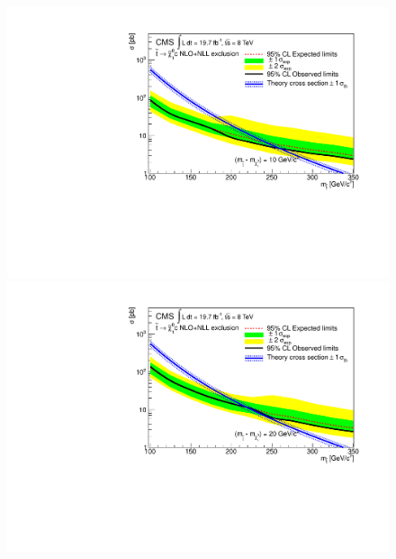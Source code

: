 \begin{figure}[!Hhtb]
  \begin{center}
  \includegraphics[scale=0.39]{Figures/sus13009/limits//Limit10.pdf}
  \includegraphics[scale=0.39]{Figures/sus13009/limits//Limit20.pdf}

\end{center}
\end{figure}
